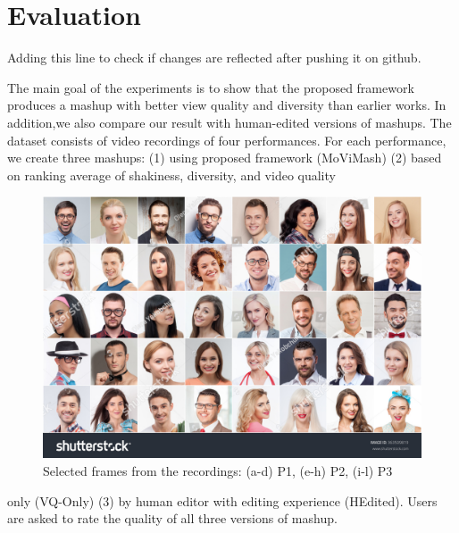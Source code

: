 \documentclass{sig-alternate}
\begin{document}
\section{Evaluation}

Adding this line to check if changes are reflected after pushing it on github.

The main goal of the experiments is to show that the proposed framework produces a mashup with better view quality and diversity than earlier works. In addition,we also compare our result with human-edited versions of mashups. The dataset consists of video recordings of four performances. For each performance, we create three mashups: (1) using proposed framework (MoViMash) (2) based on ranking average of shakiness, diversity, and video quality


\begin{figure}[h!]
    \centering
    \includegraphics{6.jpg}
    \caption{Selected frames from the recordings: (a-d) P1, (e-h) P2, (i-l) P3}
    \label{fig: 6}
\end{figure}

only (VQ-Only) (3) by human editor with editing experience (HEdited).
Users are asked to rate the quality of all three versions of
mashup.
\end{document}
